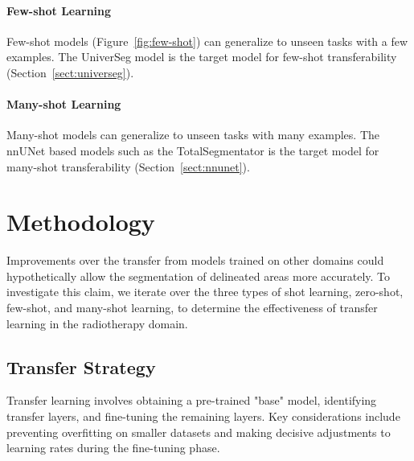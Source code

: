 \documentclass[11pt,twoside]{report}
\begin{document}
\subsubsection{Few-shot Learning}\label{sect:few-shot-learning}

Few-shot models (Figure~\ref{fig:few-shot}) can generalize to unseen tasks with a few examples. The UniverSeg model is the target model for few-shot transferability (Section~\ref{sect:universeg}).

\subsubsection{Many-shot Learning}\label{sect:many-shot-learning}

Many-shot models can generalize to unseen tasks with many examples. The nnUNet based models such as the TotalSegmentator is the target model for many-shot transferability (Section~\ref{sect:nnunet}).

\chapter{Methodology}\label{sect:methodology}

Improvements over the transfer from models trained on other domains could hypothetically allow the segmentation of delineated areas more accurately. To investigate this claim, we iterate over the three types of shot learning, zero-shot, few-shot, and many-shot learning, to determine the effectiveness of transfer learning in the radiotherapy domain.

\section{Transfer Strategy}

Transfer learning involves obtaining a pre-trained "base" model, identifying transfer layers, and fine-tuning the remaining layers. Key considerations include preventing overfitting on smaller datasets and making decisive adjustments to learning rates during the fine-tuning phase.
\end{document}

